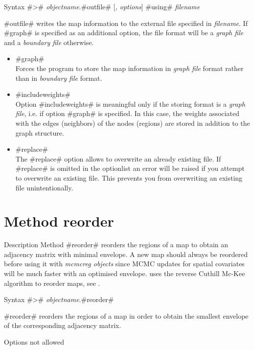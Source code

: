 \begin{stanza}{Syntax}
#># {\em objectname}.#outfile# [{\em , options}] #using# {\em filename}

#outfile# writes the map information to the external file specified in {\em filename}. If #graph# is specified as an
additional option, the file format will be a {\em graph file} and a {\em boundary file} otherwise.
\end{stanza}

\begin{itemize}
\item #graph# \\
Forces the program to store the map information in {\em graph file} format rather than in {\em boundary file} format.
\item #includeweights# \\
Option #includeweights# is meaningful only if the storing format is a {\em graph file}, i.e. if option #graph# is specified. In this case, the weights associated with the edges (neighbors) of the nodes (regions) are stored in addition to the graph structure. 
\item #replace# \\
The #replace# option allows \BayesX to overwrite an already existing file. If #replace# is omitted in the optionlist an error will be raised if you attempt to overwrite an existing file. This prevents you from overwriting an existing file unintentionally.
\end{itemize}


\section{Method reorder}
 \label{mapreorder} 

\begin{stanza}{Description}
Method #reorder# reorders the regions of a map to obtain an adjacency matrix with minimal envelope. A new map should always be reordered before using it with {\em mcmcreg objects} since MCMC updates for spatial covariates will be much faster with an optimised envelope. \BayesX uses the reverse Cuthill Mc-Kee algorithm to reorder maps, see .
\end{stanza}

\begin{stanza}{Syntax}
#># {\em objectname}.#reorder#

#reorder# reorders the regions of a map in order to obtain the smallest envelope of the corresponding adjacency matrix.
\end{stanza}

\begin{stanza}{Options}
not allowed
\end{stanza}
